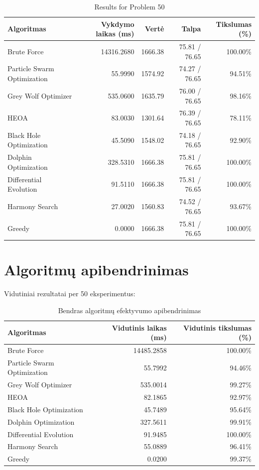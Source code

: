 \documentclass[a4paper,11pt]{article}
\begin{document}
\begin{table}[h!]
\centering
\begin{tabular}{lrrrr}
\toprule
\textbf{Algoritmas} & \textbf{Vykdymo laikas (ms)} & \textbf{Vertė} & \textbf{Talpa} & \textbf{Tikslumas (\%)} \\
\midrule
Brute Force & 14316.2680 & 1666.38 & 75.81 / 76.65 & 100.00\% \\
Particle Swarm Optimization & 55.9990 & 1574.92 & 74.27 / 76.65 & 94.51\% \\
Grey Wolf Optimizer & 535.0600 & 1635.79 & 76.00 / 76.65 & 98.16\% \\
HEOA & 83.0030 & 1301.64 & 76.39 / 76.65 & 78.11\% \\
Black Hole Optimization & 45.5090 & 1548.02 & 74.18 / 76.65 & 92.90\% \\
Dolphin Optimization & 328.5310 & 1666.38 & 75.81 / 76.65 & 100.00\% \\
Differential Evolution & 91.5110 & 1666.38 & 75.81 / 76.65 & 100.00\% \\
Harmony Search & 27.0020 & 1560.83 & 74.52 / 76.65 & 93.67\% \\
Greedy & 0.0000 & 1666.38 & 75.81 / 76.65 & 100.00\% \\
\bottomrule
\end{tabular}
\caption{Results for Problem 50}
\end{table}
\clearpage

\newpage
\section*{Algoritmų apibendrinimas}
Vidutiniai rezultatai per 50 eksperimentus:\par\medskip

\begin{table}[h!]
\centering
\begin{tabular}{lrr}
\toprule
\textbf{Algoritmas} & \textbf{Vidutinis laikas (ms)} & \textbf{Vidutinis tikslumas (\%)} \\
\midrule
Brute Force & 14485.2858 & 100.00\% \\
Particle Swarm Optimization & 55.7992 & 94.46\% \\
Grey Wolf Optimizer & 535.0014 & 99.27\% \\
HEOA & 82.1865 & 92.97\% \\
Black Hole Optimization & 45.7489 & 95.64\% \\
Dolphin Optimization & 327.5611 & 99.91\% \\
Differential Evolution & 91.9485 & 100.00\% \\
Harmony Search & 55.0889 & 96.41\% \\
Greedy & 0.0200 & 99.37\% \\
\bottomrule
\end{tabular}
\caption{Bendras algoritmų efektyvumo apibendrinimas}
\end{table}
\end{document}
